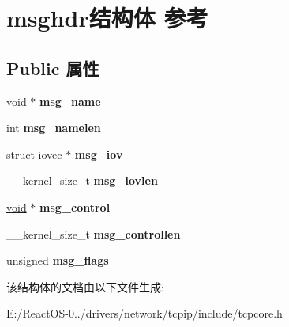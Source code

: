 \hypertarget{structmsghdr}{}\section{msghdr结构体 参考}
\label{structmsghdr}
\subsection*{Public 属性}
\begin{DoxyCompactItemize}
\item 
\mbox{\label{structmsghdr_a691a8866b21c7083974a2ff1e7987ce1}} 
\hyperlink{interfacevoid}{void} $\ast$ {\bfseries msg\+\_\+name}
\item 
\mbox{\label{structmsghdr_a8d5b5be3ce710ed39fc66824757407ff}} 
int {\bfseries msg\+\_\+namelen}
\item 
\mbox{\label{structmsghdr_a1b893a6f84c4ba52708c5dcfcc720293}} 
\hyperlink{interfacestruct}{struct} \hyperlink{structiovec}{iovec} $\ast$ {\bfseries msg\+\_\+iov}
\item 
\mbox{\label{structmsghdr_aa1ad4ffd506b40b50169a398ae144e08}} 
\+\_\+\+\_\+kernel\+\_\+size\+\_\+t {\bfseries msg\+\_\+iovlen}
\item 
\mbox{\label{structmsghdr_afba5fc31b0f197e25602d2232ca6d783}} 
\hyperlink{interfacevoid}{void} $\ast$ {\bfseries msg\+\_\+control}
\item 
\mbox{\label{structmsghdr_a85b2b49e45e656b0af23095d0e73900e}} 
\+\_\+\+\_\+kernel\+\_\+size\+\_\+t {\bfseries msg\+\_\+controllen}
\item 
\mbox{\label{structmsghdr_a9f13b95b61324b287142da48f6886de3}} 
unsigned {\bfseries msg\+\_\+flags}
\end{DoxyCompactItemize}


该结构体的文档由以下文件生成\+:\begin{DoxyCompactItemize}
\item 
E\+:/\+React\+O\+S-\/0../drivers/network/tcpip/include/tcpcore.\+h\end{DoxyCompactItemize}
